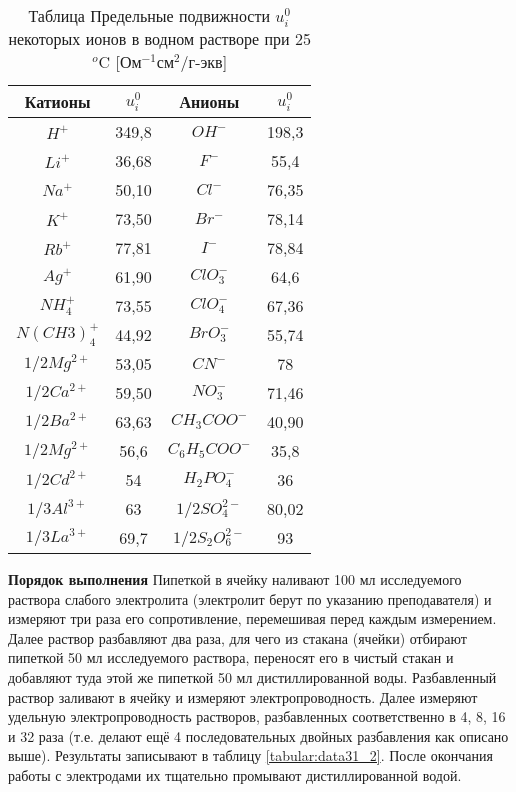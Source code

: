 \begin{longtable}[h]{|c|c|c|c|}
\caption{Таблица Предельные подвижности $u^{0}_{i}$ некоторых ионов в водном растворе при 25$^{o}$C [Ом$^{-1}$см$^{2}$/г-экв]\label{tabular:data31_1}}\\
\hline
Катионы	 & $u^{0}_{i}$ & Анионы &$u^{0}_{i}$ \\
\hline\endfirsthead
\endhead
$H^{+}$ & 349,8 & $OH^{-}$ & 198,3 \\
\hline 
$Li^{+}$ & 36,68 & $F^{-}$ & 55,4 \\
\hline 
$Na^{+}$ & 50,10 & $Cl^{-}$ & 76,35 \\
\hline 
$K^{+}$ & 73,50 & $Br^{-}$ & 78,14 \\
\hline 
$Rb^{+}$ & 77,81 & $I^{-}$ & 78,84 \\
\hline 
$Ag^{+}$ & 61,90 & $ClO_{3}^{-}$ & 64,6 \\
\hline 
$NH_{4}^{+}$ & 73,55 & $ClO_{4}^{-}$ & 67,36 \\
\hline 
$N(CH3)_{4}^{+}$ & 44,92 & $BrO_{3}^{-}$ & 55,74 \\
\hline 
$1/2 Mg^{2+}$ & 53,05 & $CN^{-}$ & 78 \\
\hline 
$1/2 Ca^{2+}$ & 59,50 & $NO_{3}^{-}$ & 71,46 \\
\hline 
$1/2 Ba^{2+}$ & 63,63 & $CH_{3}COO^{-}$ & 40,90 \\
\hline 
$1/2 Mg^{2+}$ & 56,6 & $C_{6}H_{5}COO^{-}$ & 35,8 \\
\hline 
$1/2 Cd^{2+}$ & 54 & $H_{2}PO_{4}^{-}$ & 36 \\
\hline 
$1/3 Al^{3+}$ & 63 & $1/2 SO_{4}^{2-}$ & 80,02 \\
\hline 
$1/3 La^{3+}$ & 69,7 & $1/2 S_{2}O_{6}^{2-}$ & 93 \\
\hline 
\end{longtable}

\textbf{Порядок выполнения}
Пипеткой в ячейку наливают 100 мл исследуемого раствора слабого электролита (электролит берут по  указанию  преподавателя)  и измеряют три раза его сопротивление,  перемешивая перед каждым измерением. Далее раствор разбавляют два раза,  для чего из  стакана (ячейки) отбирают пипеткой 50 мл исследуемого раствора,  переносят его в чистый стакан и добавляют туда этой же пипеткой 50 мл дистиллированной воды. Разбавленный раствор заливают в ячейку и измеряют электропроводность.
Далее измеряют  удельную электропроводность  растворов,  разбавленных соответственно в 4,  8, 16 и 32 раза (т.е. делают ещё 4 последовательных двойных разбавления  как описано  выше).  Результаты записывают в таблицу \ref{tabular:data31_2}. 
После окончания  работы  с электродами их тщательно промывают дистиллированной водой.


